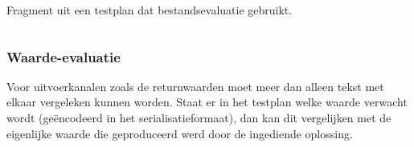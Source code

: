 \begin{listing}
    \caption{Fragment uit een testplan dat bestandsevaluatie gebruikt.}
    \label{lst:testplan-file}
    \inputminted[breaklines]{json}{code/testplan-file.json}
\end{listing}

\subsubsection{Waarde-evaluatie}

Voor uitvoerkanalen zoals de returnwaarden moet meer dan alleen tekst met elkaar vergeleken kunnen worden.
Staat er in het testplan welke waarde verwacht wordt (geëncodeerd in het serialisatieformaat), dan kan \tested{} dit vergelijken met de eigenlijke waarde die geproduceerd werd door de ingediende oplossing.

